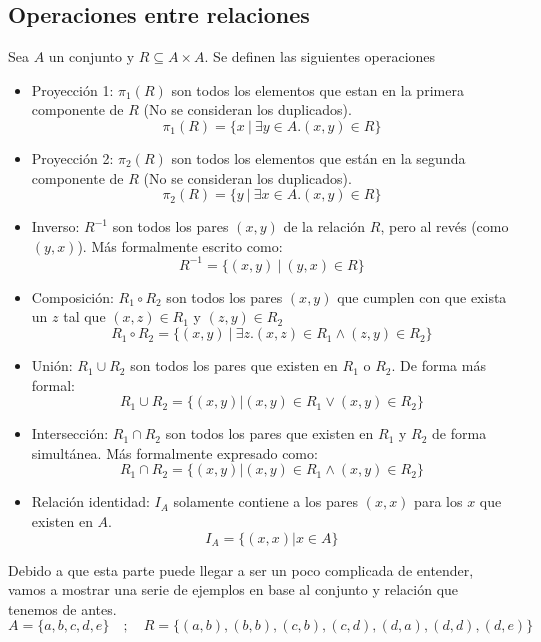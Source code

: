 \documentclass[../main.tex]{subfiles}
\begin{document}
\subsection{Operaciones entre relaciones}
Sea $A$ un conjunto y $R \subseteq A \times A$. Se definen las siguientes operaciones
\begin{itemize}
    \item Proyección 1: $\pi_1(R)$ son todos los elementos que estan en la primera componente de $R$ (No se consideran los duplicados).
    \[ \pi_1(R) = \{ x \ | \ \exists y \in A . (x,y) \in R \} \]
    \item Proyección 2: $\pi_2(R)$ son todos los elementos que están en la segunda componente de $R$ (No se consideran los duplicados).
    \[ \pi_2(R) = \{ y \ | \ \exists x \in A . (x,y) \in R \} \]
    \item Inverso: $R^{-1}$ son todos los pares $(x,y)$ de la relación $R$, pero al revés (como $(y,x)$). Más formalmente escrito como:
    \[ R^{-1} = \{ (x,y) \ | \ (y,x) \in R \} \]
    \item Composición: $R_1 \circ R_2$ son todos los pares $(x,y)$ que cumplen con que exista un $z$ tal que $(x,z) \in R_1$ y $(z,y) \in R_2$
    \[ R_1 \circ R_2 = \{(x,y) \  | \  \exists z. (x,z) \in R_1 \wedge (z,y) \in R_2 \} \]
    \item Unión: $R_1 \cup R_2$ son todos los pares que existen en $R_1$ o $R_2$. De forma más formal:
    \[ R_1 \cup R_2 = \{ (x,y) | (x,y) \in R_1 \vee (x,y) \in R_2 \} \]
    \item Intersección: $R_1 \cap R_2$ son todos los pares que existen en $R_1$ y $R_2$ de forma simultánea. Más formalmente expresado como:
    \[ R_1 \cap R_2 = \{ (x,y) | (x,y) \in R_1 \wedge (x,y) \in R_2 \} \]
    \item Relación identidad: $I_A$ solamente contiene a los pares $(x,x)$ para los $x$ que existen en $A$.
    \[ I_A = \{ (x,x) | x \in A \} \]
\end{itemize}
Debido a que esta parte puede llegar a ser un poco complicada de entender, vamos a mostrar una serie de ejemplos en base al conjunto y relación que tenemos de antes.
\[ A = \{ a, b, c, d, e \} \quad ; \quad R = \{ (a,b), (b,b), (c,b), (c,d), (d,a), (d,d), (d,e) \} \]
\end{document}
